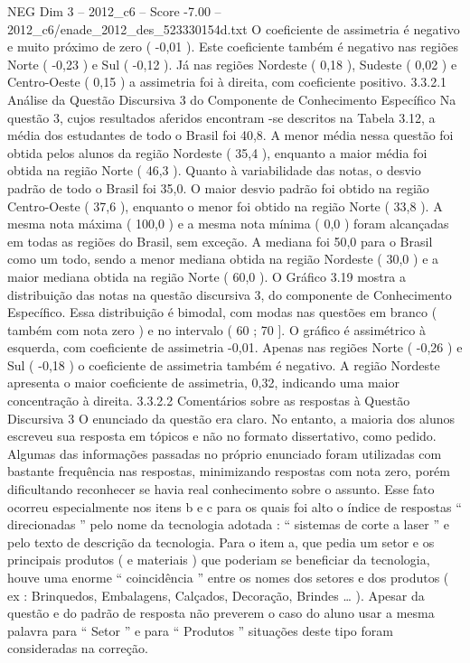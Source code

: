 \begin{textsample}{NEG Dim 3 – 2012\_c6 – Score -7.00 – 2012\_c6/enade\_2012\_des\_523330154d.txt}
O coeficiente de assimetria é negativo e muito próximo de zero ( -0,01 ).
Este coeficiente também é negativo nas regiões Norte ( -0,23 ) e Sul ( -0,12 ).
Já nas regiões Nordeste ( 0,18 ), Sudeste ( 0,02 ) e Centro-Oeste ( 0,15 ) a assimetria foi à direita, com coeficiente positivo. 3.3.2.1 Análise da Questão Discursiva 3 do Componente de Conhecimento Específico Na questão 3, cujos resultados aferidos encontram -se descritos na Tabela 3.12, a média dos estudantes de todo o Brasil foi 40,8.
A menor média nessa questão foi obtida pelos alunos da região Nordeste ( 35,4 ), enquanto a maior média foi obtida na região Norte ( 46,3 ).
Quanto à variabilidade das notas, o desvio padrão de todo o Brasil foi 35,0.
O maior desvio padrão foi obtido na região Centro-Oeste ( 37,6 ), enquanto o menor foi obtido na região Norte ( 33,8 ).
A mesma nota máxima ( 100,0 ) e a mesma nota mínima ( 0,0 ) foram alcançadas em todas as regiões do Brasil, sem exceção.
A mediana foi 50,0 para o Brasil como um todo, sendo a menor mediana obtida na região Nordeste ( 30,0 ) e a maior mediana obtida na região Norte ( 60,0 ).
O Gráfico 3.19 mostra a distribuição das notas na questão discursiva 3, do componente de Conhecimento Específico.
Essa distribuição é bimodal, com modas nas questões em branco ( também com nota zero ) e no intervalo ( 60 ; 70 ].
O gráfico é assimétrico à esquerda, com coeficiente de assimetria -0,01.
Apenas nas regiões Norte ( -0,26 ) e Sul ( -0,18 ) o coeficiente de assimetria também é negativo.
A região Nordeste apresenta o maior coeficiente de assimetria, 0,32, indicando uma maior concentração à direita. 3.3.2.2 Comentários sobre as respostas à Questão Discursiva 3 O enunciado da questão era claro.
No entanto, a maioria dos alunos escreveu sua resposta em tópicos e não no formato dissertativo, como pedido.
Algumas das informações passadas no próprio enunciado foram utilizadas com bastante frequência nas respostas, minimizando respostas com nota zero, porém dificultando reconhecer se havia real conhecimento sobre o assunto.
Esse fato ocorreu especialmente nos itens b e c para os quais foi alto o índice de respostas “ direcionadas ” pelo nome da tecnologia adotada : “ sistemas de corte a laser ” e pelo texto de descrição da tecnologia.
Para o item a, que pedia um setor e os principais produtos ( e materiais ) que poderiam se beneficiar da tecnologia, houve uma enorme “ coincidência ” entre os nomes dos setores e dos produtos ( ex : Brinquedos, Embalagens, Calçados, Decoração, Brindes … ).
Apesar da questão e do padrão de resposta não preverem o caso do aluno usar a mesma palavra para “ Setor ” e para “ Produtos ” situações deste tipo foram consideradas na correção.

\end{textsample}
